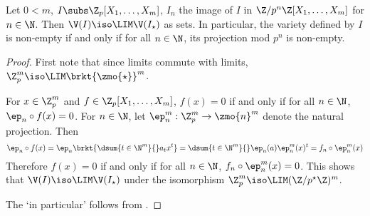 \begin{prop}

  Let $0 < m$, $I \subs \Z_p[X_1,\dots,X_m]$, $I_n$ the image of $I$
  in $\Z/p^n\Z[X_1,\dots,X_m]$ for $n \in \N$. 
  Then $\V(I) \iso \LIM \V(I_\star)$ as sets. 
  In particular, 
  the variety defined by $I$ is non-empty if and only if 
  for all $n\in \N$, its projection mod $p^n$ is non-empty. 
\end{prop}
\begin{proof}
  
  First note that 
  since limits commute with limits, 
  $\Z_p^m \iso \LIM \brkt{\zmo{\star}}^m$.

  For $x \in \Z_p^m$ and $f \in \Z_p[X_1,\dots,X_m]$,
  $f(x) = 0$ if and only if for all $n \in \N$, $\ep_n\circ f(x) = 0$. 
  For $n \in \N$, 
  let $\ep_n^m : \Z_p^m \to \zmo{n}^m$ denote the natural projection.
  Then \[
    \ep_n\circ f(x) = \ep_n\brkt{\dsum{t\in\N^m}{}a_tx^t}
    = \dsum{t\in\N^m}{}\ep_n(a)\ep_n^m(x)^t
    = f_n\circ\ep_n^m(x)
  \]
  Therefore $f(x) = 0$ if and only if 
  for all $n\in\N$, $f_n\circ\ep_n^m(x) = 0$.
  This shows that $\V(I) \iso \LIM \V(I_\star)$
  under the isomorphism $\Z_p^m \iso \LIM (\Z/p^\star\Z)^m$. 

  The `in particular' follows from 
  .
\end{proof}


